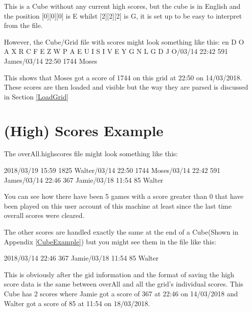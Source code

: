 \begin{appendices}
    This is a Cube without any current high scores, but the cube is in English and the position [0][0][0] is E whilst [2][2][2] is G, it is set up to be easy to interpret from the file.
    \newline%
    \newline
    \newline
    \newline
    \newline
    
      However, the Cube/Grid file with scores might look something like this:\newline
    en\newline
    D O A\newline
    X R C\newline
    F E Z\newline
    W P A\newline
    E U I\newline
    S I V\newline
    E Y G\newline
    N L G\newline
    D J O/03/14 22:42 591 James/03/14 22:50 1744 Moses

    This shows that Moses got a score of 1744 on this grid at 22:50 on 14/03/2018. These scores are then loaded and visible but the way they are parsed is discussed in Section \ref{LoadGrid}
\section{(High) Scores Example} \label{HighScoresExample}
    The overAll.highscores file might look something like this:
    
    2018/03/19 15:59 1825 Walter/03/14 22:50 1744 Moses/03/14 22:42 591 James/03/14 22:46 367 Jamie/03/18 11:54 85 Walter

    You can see how there have been 5 games with a score greater than 0 that have been played on this user account of this machine at least since the last time overall scores were cleared.
    
    The other scores are handled exactly the same at the end of a Cube(Shown in Appendix \ref{CubeExample}) but you might see them in the file like this:
    
    2018/03/14 22:46 367 Jamie/03/18 11:54 85 Walter
    
    This is obviously after the gid information and the format of saving the high score data is the same between overAll and all the grid's individual scores. This Cube has 2 scores where Jamie got a score of 367 at 22:46 on 14/03/2018 and Walter got a score of 85 at 11:54 on 18/03/2018.
\end{appendices}